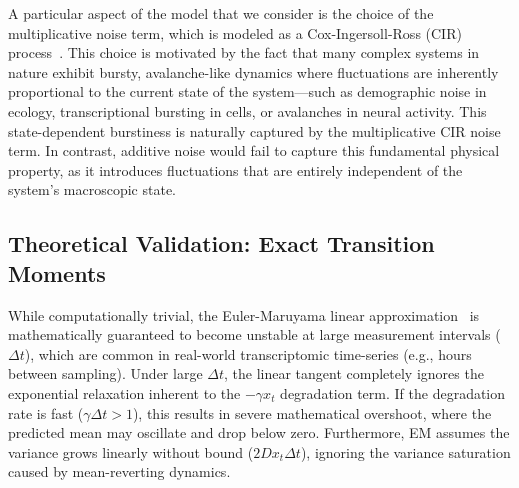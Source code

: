 \documentclass[10pt, aps, rmp,  twocolumn, superscriptaddress, floatfix, showkeys]{revtex4-2}
\begin{document}

A particular aspect of the model that we consider is the choice of the multiplicative noise term, which is modeled as a Cox-Ingersoll-Ross (CIR) process~\cite{cox1985theory}. This choice is motivated by the fact that many complex systems in nature exhibit bursty, avalanche-like dynamics where fluctuations are inherently proportional to the current state of the system—such as demographic noise in ecology, transcriptional bursting in cells, or avalanches in neural activity. This state-dependent burstiness is naturally captured by the multiplicative CIR noise term. In contrast, additive noise would fail to capture this fundamental physical property, as it introduces fluctuations that are entirely independent of the system's macroscopic state.






\subsection{Theoretical Validation: Exact Transition Moments}


While computationally trivial, the Euler-Maruyama linear approximation~\cite{kloeden1992numerical} is mathematically guaranteed to become unstable at large measurement intervals ($\Delta t$), which are common in real-world transcriptomic time-series (e.g., hours between sampling). Under large $\Delta t$, the linear tangent completely ignores the exponential relaxation inherent to the $-\gamma x_t$ degradation term. If the degradation rate is fast ($\gamma \Delta t > 1$), this results in severe mathematical overshoot, where the predicted mean may oscillate and drop below zero. Furthermore, EM assumes the variance grows linearly without bound ($2D x_t \Delta t$), ignoring the variance saturation caused by mean-reverting dynamics.
\end{document}
